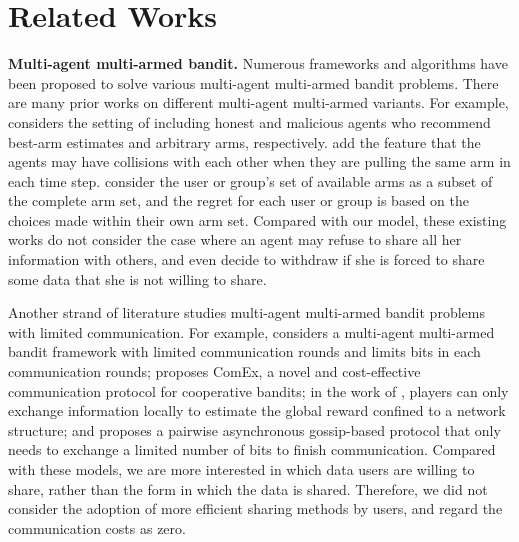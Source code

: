\section{Related Works}
    \textbf{Multi-agent multi-armed bandit.} Numerous frameworks and algorithms have been proposed to solve various multi-agent multi-armed bandit problems. 
    There are many prior works on different multi-agent multi-armed variants.
    For example, 
    \cite{vial2021robust} considers the setting of including honest and malicious agents who recommend best-arm estimates and arbitrary arms, respectively. \cite{liu2020competing,zhangmatching,kong2023player} 
    add the feature that the agents may have collisions with each other when they are pulling the same arm in each time step. \cite{baek2021fair,yang2022distributed} consider the user or group's set of available arms as a subset of the complete arm set, and the regret for each user or group is based on the choices made within their own arm set.
    Compared with our model, these existing works do not consider the case where an agent may refuse to share all her information with others, and even decide to withdraw if she is forced to share some data that she is not willing to share.
    
    Another strand of literature studies multi-agent multi-armed bandit problems with limited communication. For example, \cite{agarwal2021multi} considers a multi-agent multi-armed bandit framework with limited communication rounds and limits bits in each communication rounds; \cite{madhushani2021call} proposes ComEx, a novel and cost-effective communication protocol for cooperative bandits; in the work of \cite{shahrampour2017multi}, players can only exchange information locally to estimate the global reward confined to a network structure; and \cite{sankararaman2019social} proposes a pairwise asynchronous gossip-based protocol that only needs to exchange a limited number of bits to finish communication. 
%
Compared with these models, we are more interested in which data users are willing to share, rather than the form in which the data is shared. Therefore, we did not consider the adoption of more efficient sharing methods by users, and regard the communication costs as zero. %

